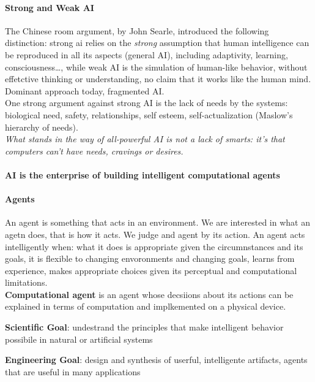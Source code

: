 \documentclass[10pt]{report}
\begin{document}
\paragraph{Strong and Weak AI} The Chinese room argument, by John Searle, introduced the following distinction: strong ai relies on the \textit{strong} assumption that human intelligence can be reproduced in all its aspects (general AI), including adaptivity, learning, consciousness\ldots, while weak AI is the simulation of human-like behavior, without effetctive thinking or understanding, no claim that it works like the human mind. Dominant approach today, fragmented AI.\\
One strong argument against strong AI is the lack of needs by the systems: biological need, safety, relationships, self esteem, self-actualization (Maslow's hierarchy of needs).\\
\textit{What stands in the way of all-powerful AI is not a lack of smarts: it's that computers can't have needs, cravings or desires.}\\\\
\textbf{AI is the enterprise of building intelligent computational agents}
\paragraph{Agents} An agent is something that acts in an environment. We are interested in what an agetn does, that is how it acts. We judge and agent by its action. An agent acts intelligently when: what it does is appropriate given the circumnstances and its goals, it is flexible to changing envoronments and changing goals, learns from experience, makes appropriate choices given its perceptual and computational limitations.\\
\textbf{Computational agent} is an agent whose decsiions about its actions can be explained in terms of computation and implkemented on a physical device.
\begin{list}{}{}
	\item \textbf{Scientific Goal}: undestrand the principles that make intelligent behavior possibile in natural or artificial systems
	\item \textbf{Engineering Goal}: design and synthesis of userful, intelligente artifacts, agents that are useful in many applications
\end{list}
\end{document}

